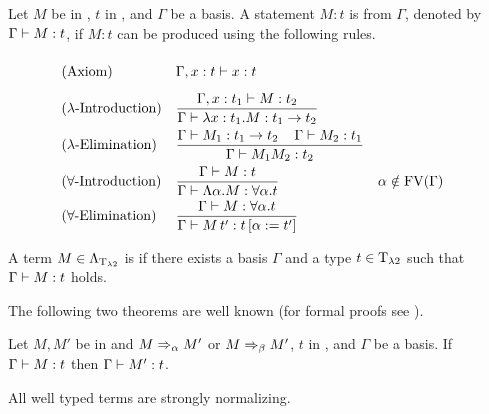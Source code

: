 \begin{definition}\label{def.2.10}
Let $M$ be in \lambdaTerms{}, $t$ in \lambdaTypes, and $\Gamma$ be a basis. A statement $M:t$ is  from $\Gamma$, denoted by $\Gamma\vdash M:t$, if $M:t$ can be produced using the following rules.
\begin{mdframed} 
	\begingroup
	\addtolength{\jot}{0.3cm}
	\begin{align*}
		&(\text{Axiom}) &&\Gamma,x:t\lambdaModels x:t\vphantom{\frac{t_1}{t_1}}\\
		&(\lambda\text{-Introduction}) &&\frac{\Gamma,x:t_1\lambdaModels M:t_2}{\Gamma\lambdaModels \lambda x:t_1.M:t_1\to t_2}\\
		&(\lambda\text{-Elimination}) &&\frac{\Gamma\lambdaModels M_1:t_1\to t_2 \hspace{0.4cm}\Gamma\lambdaModels M_2:t_1}{\Gamma\lambdaModels M_1M_2:t_2}\\
& (\forall\text{-Introduction}) &   & \frac{\Gamma\lambdaModels M:t}{\Gamma\lambdaModels \Lambda\alpha.M:\forall\alpha.t}                 &   & \alpha\notin\FV(\Gamma) \\
& (\forall\text{-Elimination})  &   & \frac{\Gamma\lambdaModels M:\forall\alpha.t }{\Gamma\lambdaModels M\,t':t\left[ \alpha:=t'\right] } 
	\end{align*}
	\endgroup
\end{mdframed}
\end{definition}

\begin{definition}\label{def.2.11}
A term $M\in\Lambda_{\text{T}_{\lambda2}}$ is  if there exists a basis $\Gamma$ and a type $t\in\text{T}_{\lambda2}$ such that $\Gamma\vdash M:t$ holds.
\end{definition}

The following two theorems are well known (for formal proofs see \cite{1}).

\begin{theorem}\label{the.2.12}
Let $M,M'$ be in \lambdaTerms{} and $M\Rightarrow_\alpha M'$ or $M\Rightarrow_\beta M'$, $t$ in \lambdaTypes, and $\Gamma$ be a basis. If $\Gamma\vdash M:t$ then $\Gamma\vdash M':t$.
\end{theorem}

\begin{theorem}\label{the.2.13}
All well typed \lambdaTwo{} terms are strongly normalizing.
\end{theorem}

